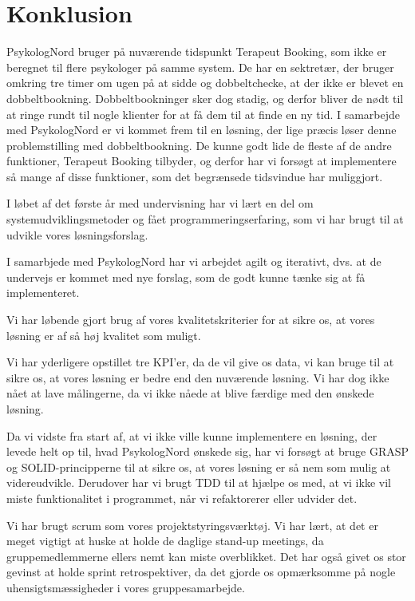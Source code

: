 \newpage
\section{Konklusion}
PsykologNord bruger på nuværende tidspunkt Terapeut Booking, som ikke er beregnet til flere psykologer på samme system.
De har en sektretær, der bruger omkring tre timer om ugen på at sidde og dobbeltchecke, at der ikke er blevet en dobbeltbookning.
Dobbeltbookninger sker dog stadig, og derfor bliver de nødt til at ringe rundt til nogle klienter for at få dem til at finde en ny tid.
I samarbejde med PsykologNord er vi kommet frem til en løsning, der lige præcis løser denne problemstilling med dobbeltbookning.
De kunne godt lide de fleste af de andre funktioner, Terapeut Booking tilbyder, og derfor har vi forsøgt at implementere så mange af disse funktioner, som det begrænsede tidsvindue har muliggjort.

I løbet af det første år med undervisning har vi lært en del om systemudviklingsmetoder og fået programmeringserfaring, som vi har brugt til at udvikle vores løsningsforslag.

I samarbjede med PsykologNord har vi arbejdet agilt og iterativt, dvs. at de undervejs er kommet med nye forslag, som de godt kunne tænke sig at få implementeret.

Vi har løbende gjort brug af vores kvalitetskriterier for at sikre os, at vores løsning er af så høj kvalitet som muligt.

Vi har yderligere opstillet tre KPI'er, da de vil give os data, vi kan bruge til at sikre os, at vores løsning er bedre end den nuværende løsning.
Vi har dog ikke nået at lave målingerne, da vi ikke nåede at blive færdige med den ønskede løsning.

Da vi vidste fra start af, at vi ikke ville kunne implementere en løsning, der levede helt op til, hvad PsykologNord ønskede sig, har vi forsøgt at bruge GRASP og SOLID-principperne til at sikre os, at vores løsning er så nem som mulig at videreudvikle.
Derudover har vi brugt TDD til at hjælpe os med, at vi ikke vil miste funktionalitet i programmet, når vi refaktorerer eller udvider det.

Vi har brugt scrum som vores projektstyringsværktøj.
Vi har lært, at det er meget vigtigt at huske at holde de daglige stand-up meetings, da gruppemedlemmerne ellers nemt kan miste overblikket.
Det har også givet os stor gevinst at holde sprint retrospektiver, da det gjorde os opmærksomme på nogle uhensigtsmæssigheder i vores gruppesamarbejde.